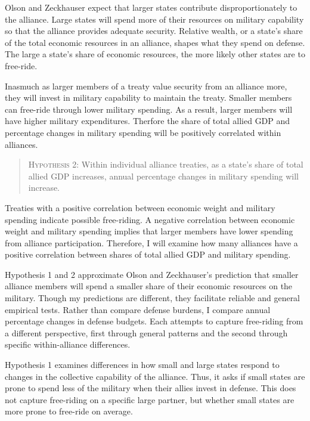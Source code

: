 \documentclass[12pt]{article}
\begin{document}
Olson and Zeckhauser expect that larger states contribute disproportionately to the alliance. 
Large states will spend more of their resources on military capability so that the alliance provides adequate security. 
Relative wealth, or a state's share of the total economic resources in an alliance, shapes what they spend on defense. 
The large a state's share of economic resources, the more likely other states are to free-ride. 


Inasmuch as larger members of a treaty value security from an alliance more, they will invest in military capability to maintain the treaty.
Smaller members can free-ride through lower military spending. 
As a result, larger members will have higher military expenditures. 
Therfore the share of total allied GDP and percentage changes in military spending will be positively correlated within alliances. 


\begin{quote}
\textsc{Hypothesis 2}: Within individual alliance treaties, as a state's share of total allied GDP increases, annual percentage changes in military spending will increase. 
\end{quote}


Treaties with a positive correlation between economic weight and military spending indicate possible free-riding. 
A negative correlation between economic weight and military spending implies that larger members have lower spending from alliance participation. 
Therefore, I will examine how many alliances have a positive correlation between shares of total allied GDP and military spending.  
 

Hypothesis 1 and 2 approximate Olson and Zeckhauser's prediction that smaller alliance members will spend a smaller share of their economic resources on the military. 
Though my predictions are different, they facilitate reliable and general empirical tests.
Rather than compare defense burdens, I compare annual percentage changes in defense budgets.  
Each attempts to capture free-riding from a different perspective, first through general patterns and the second through specific within-alliance differences. 


Hypothesis 1 examines differences in how small and large states respond to changes in the collective capability of the alliance.
Thus, it asks if small states are prone to spend less of the military when their allies invest in defense. 
This does not capture free-riding on a specific large partner, but whether small states are more prone to free-ride on average. 
\end{document}

